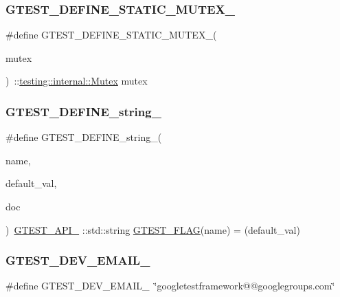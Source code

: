 \subsubsection{\texorpdfstring{GTEST\_DEFINE\_STATIC\_MUTEX\_}{GTEST\_DEFINE\_STATIC\_MUTEX\_}}
{\footnotesize\ttfamily \#define G\+T\+E\+S\+T\+\_\+\+D\+E\+F\+I\+N\+E\+\_\+\+S\+T\+A\+T\+I\+C\+\_\+\+M\+U\+T\+E\+X\+\_\+(\begin{DoxyParamCaption}\item[{}]{mutex }\end{DoxyParamCaption})~\+::\mbox{\hyperlink{classtesting_1_1internal_1_1_mutex}{testing\+::internal\+::\+Mutex}} mutex}

\mbox{\label{gtest-port_8h_a885e18fe217a6e85553d408b99252c12}} 
\subsubsection{\texorpdfstring{GTEST\_DEFINE\_string\_}{GTEST\_DEFINE\_string\_}}
{\footnotesize\ttfamily \#define G\+T\+E\+S\+T\+\_\+\+D\+E\+F\+I\+N\+E\+\_\+string\+\_\+(\begin{DoxyParamCaption}\item[{}]{name,  }\item[{}]{default\+\_\+val,  }\item[{}]{doc }\end{DoxyParamCaption})~\mbox{\hyperlink{gtest-port_8h_aa73be6f0ba4a7456180a94904ce17790}{G\+T\+E\+S\+T\+\_\+\+A\+P\+I\+\_\+}} \+::std\+::string \mbox{\hyperlink{gtest-port_8h_a828f4e34a1c4b510da50ec1563e3562a}{G\+T\+E\+S\+T\+\_\+\+F\+L\+AG}}(name) = (default\+\_\+val)}

\mbox{\label{gtest-port_8h_a21086d276b1a64d6763ee8a94b12c1b8}} 
\subsubsection{\texorpdfstring{GTEST\_DEV\_EMAIL\_}{GTEST\_DEV\_EMAIL\_}}
{\footnotesize\ttfamily \#define G\+T\+E\+S\+T\+\_\+\+D\+E\+V\+\_\+\+E\+M\+A\+I\+L\+\_\+~\char`\"{}googletestframework@@googlegroups.\+com\char`\"{}}

